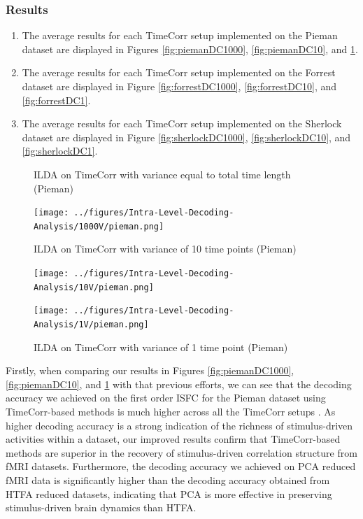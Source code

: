 \documentclass[11pt]{article}
\begin{document}
\begin{enumerate}
\subsubsection{Results}
\begin{enumerate}
\item The average results for each TimeCorr setup implemented on the Pieman dataset are displayed in Figures \ref{fig:piemanDC1000}, \ref{fig:piemanDC10}, and \ref{fig:piemanDC1}.
\item The average results for each TimeCorr setup implemented on the Forrest dataset are displayed in Figure \ref{fig:forrestDC1000}, \ref{fig:forrestDC10}, and \ref{fig:forrestDC1}.
\item The average results for each TimeCorr setup implemented on the Sherlock dataset are displayed in Figure \ref{fig:sherlockDC1000}, \ref{fig:sherlockDC10}, and \ref{fig:sherlockDC1}.
\end{enumerate}

\begin{figure}[!htb]
\caption{ILDA on TimeCorr with variance equal to total time length (Pieman)}
\centering
\texttt{[image: ../figures/Intra-Level-Decoding-Analysis/1000V/pieman.png]}
\label{fig:piemanDC1000}
\caption{ILDA on TimeCorr with variance of 10 time points (Pieman)}
\centering
\texttt{[image: ../figures/Intra-Level-Decoding-Analysis/10V/pieman.png]}
\label{fig:piemanDC10}
\caption{ILDA on TimeCorr with variance of 1 time point (Pieman)}
\centering
\texttt{[image: ../figures/Intra-Level-Decoding-Analysis/1V/pieman.png]}
\label{fig:piemanDC1}
\end{figure}

Firstly, when comparing our results in Figures \ref{fig:piemanDC1000}, \ref{fig:piemanDC10}, and \ref{fig:piemanDC1} with that previous efforts, we can see that the decoding accuracy we achieved on the first order ISFC for the Pieman dataset using TimeCorr-based methods is much higher across all the TimeCorr setups \citep{jeremy2017}. As higher decoding accuracy is a strong indication of the richness of stimulus-driven activities within a dataset, our improved results confirm that TimeCorr-based methods are superior in the recovery of stimulus-driven correlation structure from fMRI datasets. Furthermore, the decoding accuracy we achieved on PCA reduced fMRI data is significantly higher than the decoding accuracy obtained from HTFA reduced datasets, indicating that PCA is more effective in preserving stimulus-driven brain dynamics than HTFA.


\end{enumerate}
\end{document}
